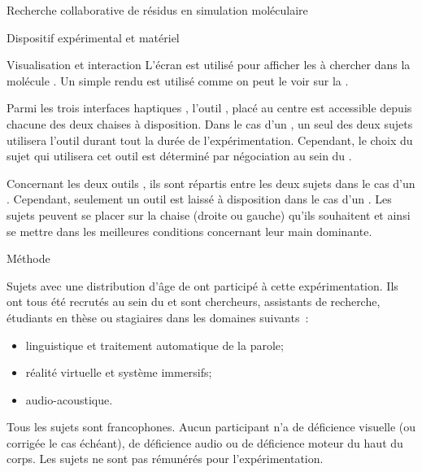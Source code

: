 \documentclass[myfrancais]{mythesis}
\begin{document}
\begin{mychapter}{Recherche collaborative de résidus en simulation moléculaire}
\begin{mysection}{Dispositif expérimental et matériel}
\begin{mysubsection}{Visualisation et interaction}
				L'écran \myLCD est utilisé pour afficher les  à chercher dans la molécule .
				Un simple rendu \myCPK est utilisé comme on peut le voir sur la .

				Parmi les trois interfaces haptiques \myOmni, l'outil , placé au centre est accessible depuis chacune des deux chaises à disposition.
				Dans le cas d'un , un seul des deux sujets utilisera l'outil durant tout la durée de l'expérimentation.
				Cependant, le choix du sujet qui utilisera cet outil est déterminé par négociation au sein du .

				Concernant les deux outils , ils sont répartis entre les deux sujets dans le cas d'un .
				Cependant, seulement un outil  est laissé à disposition dans le cas d'un .
				Les sujets peuvent se placer sur la chaise (droite ou gauche) qu'ils souhaitent et ainsi se mettre dans les meilleures conditions concernant leur main dominante.
			\end{mysubsection}
		\end{mysection}
		\begin{mysection}{Méthode}
			\begin{mysubsection}{Sujets}
				 avec une distribution d'âge de  ont participé à cette expérimentation.
				Ils ont tous été recrutés au sein du  et sont chercheurs, assistants de recherche, étudiants en thèse ou stagiaires dans les domaines suivants~:
				\begin{itemize}
					\item linguistique et traitement automatique de la parole;
					\item réalité virtuelle et système immersifs;
					\item audio-acoustique.
				\end{itemize}

				Tous les sujets sont francophones.
				Aucun participant n'a de déficience visuelle (ou corrigée le cas échéant), de déficience audio ou de déficience moteur du haut du corps.
				Les sujets ne sont pas rémunérés pour l'expérimentation.


\end{mysubsection}
\end{mysection}
\end{mychapter}
\end{document}
